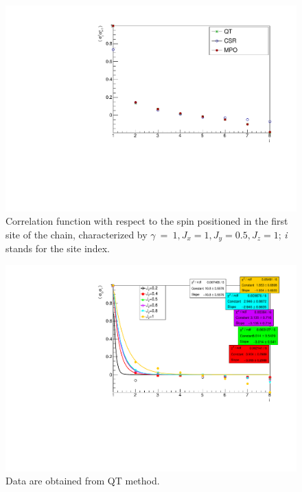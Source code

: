 \begin{figure}[H]
    \centering
    \includegraphics[scale=0.7]{Figures/8sites_comparison/CorrFunc1_8s_J1051.pdf}
    \caption{Correlation function with respect to the spin positioned in the first site of the chain, characterized by $\gamma~=~1, J_x=1, J_y=0.5, J_z=1$; \emph{i} stands for the site index.}
    \label{fig:my_label}
\end{figure}

\begin{figure}[H]
    \centering
    \includegraphics[scale=0.7]{Figures/8sites_comparison/FIT8sCorrFunc1_QT_under1.pdf}
    \caption{Data are obtained from QT method.}
    \label{fig:my_label}
\end{figure}

